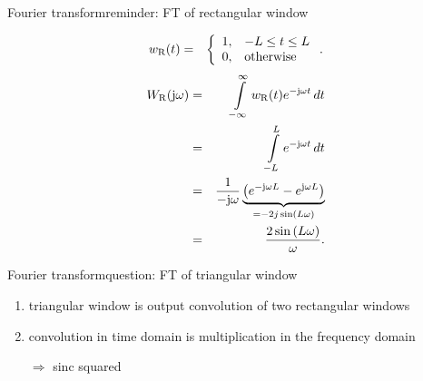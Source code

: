 	\begin{frame}{Fourier transform}{reminder: FT of rectangular window}
        \vspace{-8mm}
        \begin{footnotesize}
        \begin{eqnarray*}
            w_{\mathrm{R}}(t)	&=& \left\lbrace  
                        \begin{array}{ll} 
                                                    1, & -L \leq t \leq L\\ 
                          \vphantom{\frac{1}{1}} 	0, & \text{otherwise} \\ 
                        \end{array} 
                        \right. .
        \end{eqnarray*}
\pause
        \begin{eqnarray*}
            W_{\mathrm{R}}(\mathrm{j}\omega) 	&=& \int\limits_{-\infty}^{\infty} {w_{\mathrm{R}}(t){e}^{-\mathrm{j}\omega t}\,dt}\nonumber\\
                        &=& \int\limits_{-L}^{L} {{e}^{-\mathrm{j}\omega t}\,dt}\nonumber\\
                        &=& \frac{1}{-\mathrm{j}\omega} \underbrace{\left({e}^{-\mathrm{j}{\omega L}}-{e}^{\mathrm{j}{\omega L}}\right)}_{= -2j\sin\left({L\omega}\right)}\nonumber\\
                        &=& \frac{2\sin\left({L\omega}\right)}{{\omega}}  .
        \end{eqnarray*}
        \end{footnotesize}
	\end{frame}	

	\begin{frame}{Fourier transform}{question: FT of triangular window}
        \bigskip
        \bigskip
        \begin{enumerate}
            \item   triangular window is output convolution of two rectangular windows
            \item   convolution in time domain is multiplication in the frequency domain
            \item[$\Rightarrow$] sinc squared
        \end{enumerate}
	\end{frame}	


